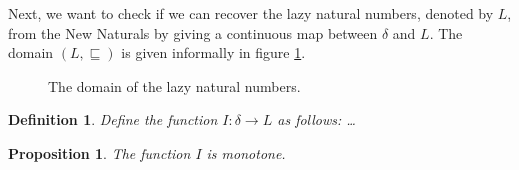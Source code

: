 \documentclass[a4paper]{article}
\newcommand{\arr}{\rightarrow}
\newtheorem{defIMapsNuFToL}[defNuF]{Definition}
\newtheorem{thmIIsMonotone}[defNuF]{Proposition}
\begin{document}
Next, we want to check if we can recover the lazy natural numbers, denoted by
$L$, from the New Naturals by giving a continuous map between $\delta$ and $L$.
The domain $(L, \sqsubseteq)$ is given informally in figure
\ref{fig:DomainOfLazyNaturals}.


\begin{figure}
\begin{center}
\end{center}
\caption{The domain of the lazy natural numbers.}
\label{fig:DomainOfLazyNaturals}
\end{figure}

\begin{defIMapsNuFToL}

Define the function $I : \delta \arr L$ as follows: \ldots

\end{defIMapsNuFToL}


\begin{thmIIsMonotone}

The function $I$ is monotone.

\end{thmIIsMonotone}
\end{document}
